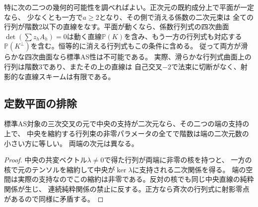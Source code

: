 特に次の二つの幾何的可能性を調べればよい。正次元の既約成分上で平面が一定なら、
少なくとも一方で$a\ge2$となり、その側で消える係数の二次元束は
全ての行列が階数2以下の直線をなす。平面が動くなら、係数行列式の四次曲面
$\det(\sum z_h A_h)=0$は動く直線$\mathbb P(K)$を含み、もう一方の行列式も対応する
$\mathbb P(K^\perp)$を含む。恒等的に消える行列式もこの条件に含める。
従って両方が滑らかな四次曲面なら標準AS性は不可能である。
実際、滑らかな行列式曲面上の行列は階数3であり、またその上の直線は
自己交叉$-2$で法束に切断がなく、射影的な直線スキームは有限である。

\subsection{定数平面の排除}
\begin{lemma}[中央二次元の三テンソルの束]\label{lem:middle-binary-pencil}
標準AS対象の三次交叉の元で中央の支持が二次元なら、その二つの端の支持の上で、
中央を縮約する行列束の非零パラメータの全てで階数は端の二次元数の小さい方に等しい。
両端の次元は異なる。
\end{lemma}
\begin{proof}
中央の共変ベクトル$\lambda\ne0$で得た行列が両端に非零の核を持つと、
一方の核で元のテンソルを縮約して中央が$\ker\lambda$に支持される二次関係を得る。
端の空間は実際の支持なのでこの縮約は非零である。反対の核でも同じ中央直線の純粋関係が生じ、
連続純粋関係の禁止に反する。正方なら斉次の行列式に射影零点があるので同様に矛盾する。
\end{proof}

